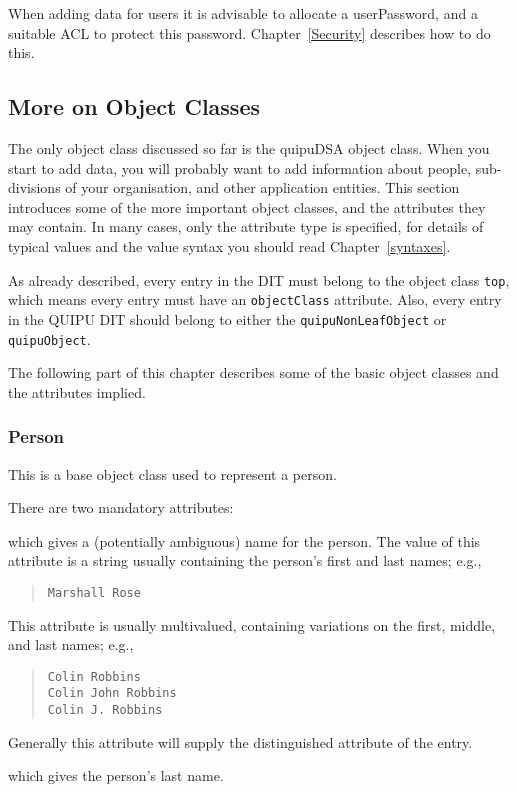 When adding data for users it is advisable to allocate a 
userPassword, and a suitable
ACL to protect
this password.
Chapter~\ref{Security} describes how to do this.

\subsection {More on Object Classes}
The only object class discussed so far is the quipuDSA object class.
When you start to add data, you will probably want to add information about
people, sub-divisions of your organisation, and other application entities.
This section introduces some of the more important object classes, and the
attributes they may contain.
In many cases, only the attribute type is specified, for details of typical
values and the value syntax you should read Chapter~\ref{syntaxes}.

As already described, every entry in the DIT must belong to the object
class \verb+top+, which means every entry must have an \verb+objectClass+
attribute.
Also, every entry in the QUIPU DIT should belong to either the
\verb+quipuNonLeafObject+ or \verb+quipuObject+.

The following part of this chapter describes some of the basic
object classes and the attributes implied.

\subsubsection{Person}
This is a base object class used to represent a person.

There are two mandatory attributes:
\begin{describe}
\item[1. \verb+commonName+:]
			which gives a (potentially ambiguous) name for
			the person.
			The value of this attribute is a string usually
			containing the person's first and last names; e.g.,
\small\begin{quote}\begin{verbatim}
Marshall Rose
\end{verbatim}\end{quote}
			This attribute is usually multivalued, containing
			variations on the first, middle, and last names; e.g.,
\small\begin{quote}\begin{verbatim}
Colin Robbins
Colin John Robbins
Colin J. Robbins
\end{verbatim}\end{quote}
			Generally this attribute will supply the
			distinguished attribute of the entry.
\item[2. \verb+surName+:]
			which gives the person's last name.
\end{describe}

